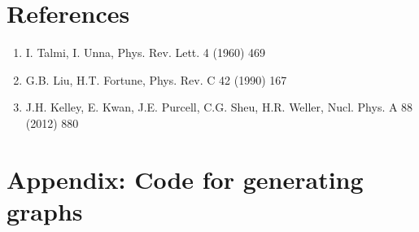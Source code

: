 \documentclass[11pt]{article} %
\begin{document}
\section{References}
\begin{enumerate}
\item I. Talmi, I. Unna, Phys. Rev. Lett. 4 (1960) 469
\item G.B. Liu, H.T. Fortune, Phys. Rev. C 42 (1990) 167
\item J.H. Kelley, E. Kwan, J.E. Purcell, C.G. Sheu, H.R. Weller, Nucl. Phys. A 88 (2012) 880
\end{enumerate}


\section{Appendix: Code for generating graphs}

\end{document}
